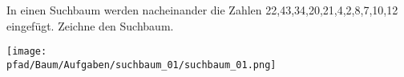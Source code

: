 \question[3]
In einen Suchbaum werden nacheinander die Zahlen
22,43,34,20,21,4,2,8,7,10,12
eingefügt. Zeichne den Suchbaum.

\begin{solutionbox}{7cm}

\texttt{[image: \\pfad/Baum/Aufgaben/suchbaum\_01/suchbaum\_01.png]}
\end{solutionbox}
